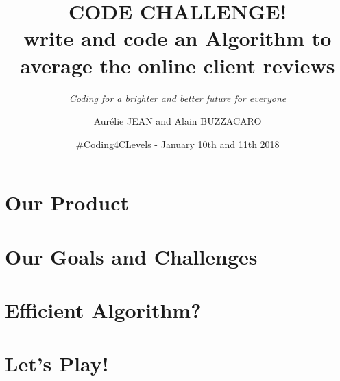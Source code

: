 \documentclass{beamer}
\title{CODE CHALLENGE!\\ write and code an Algorithm to average the online client reviews}
\subtitle{\textcolor{isvblue}{\textit{Coding for a brighter and better future for everyone}}}
\author{Aur\'elie JEAN and Alain BUZZACARO}
\institute{\textcolor{isvblue}{aurelie@silicoveritas.com - abuzzacaro@octo.com}}
\date{\#Coding4CLevels - January 10th and 11th 2018}
\begin{document}
	\setcounter{showProgressBar}{0}
	\setcounter{showSlideNumbers}{0}

        \begin{frame}%
        \maketitle
        \end{frame}


	\setcounter{framenumber}{0}
	\setcounter{showProgressBar}{1}
	\setcounter{showSlideNumbers}{1}

        \section{Our Product}
        

        \section{Our Goals and Challenges}
        

        \section{Efficient Algorithm?}
        

        \section{Let's Play!}
\end{document}
